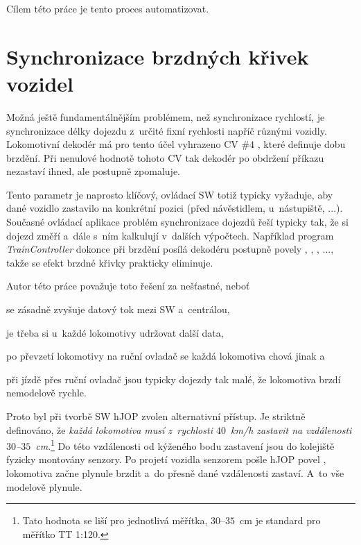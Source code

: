 Cílem této práce je tento proces automatizovat.

\section{Synchronizace brzdných křivek vozidel}
\label{sec:sync-krivky}

Možná ještě fundamentálnějším problémem, než synchronizace rychlostí, je
synchronizace délky dojezdu z~určité fixní rychlosti napříč různými vozidly.
Lokomotivní dekodér má pro tento účel vyhrazeno \gls{CV} $\#4$ \cite{zimo:cvs}, které
definuje dobu brzdění. Při nenulové hodnotě tohoto \gls{CV} tak dekodér po obdržení
příkazu  nezastaví ihned, ale postupně zpomaluje.

Tento parametr je naprosto klíčový, ovládací SW totiž typicky vyžaduje, aby dané
vozidlo zastavilo na konkrétní pozici (před návěstidlem, u~nástupiště, ...).
Současné ovládací aplikace problém synchronizace dojezdů řeší typicky tak, že si
dojezd změří a~dále s~ním kalkulují v~dalších výpočtech. Například program
\textit{TrainController} \cite{traincontroller:web} dokonce při brzdění
posílá dekodéru postupně povely , ,
, ..., takže se efekt brzdné křivky prakticky eliminuje.

Autor této práce považuje toto řešení za nešťastné, neboť
\begin{compactenum}
\item se zásadně zvyšuje datový tok mezi SW a~centrálou,
\item je třeba si u~každé lokomotivy udržovat další data,
\item po převzetí lokomotivy na ruční ovladač se každá lokomotiva chová jinak a
\item při jízdě přes ruční ovladač jsou typicky dojezdy tak malé, že lokomotiva
      brzdí nemodelově rychle.
\end{compactenum}

Proto byl při tvorbě SW hJOP zvolen alternativní přístup. Je striktně
definováno, že \textit{každá lokomotiva musí z~rychlosti $40$~km/h zastavit na
vzdálenosti $30$\mbox{--}$35$~cm}.\footnote{Tato hodnota se liší pro jednotlivá měřítka,
$30$\mbox{--}$35$~cm je standard pro měřítko TT 1:120.} Do této vzdálenosti od
kýženého bodu zastavení jsou do kolejiště fyzicky montovány senzory. Po
projetí vozidla senzorem pošle hJOP povel ,
lokomotiva začne plynule brzdit a~do přesně dané vzdálenosti zastaví. A~to vše
modelově plynule.

